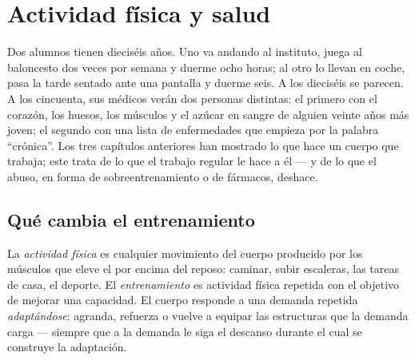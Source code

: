 \chapter{Actividad física y salud}\label{ch:g10:sport-and-health}

Dos alumnos tienen dieciséis años. Uno va andando al instituto, juega
al baloncesto dos veces por semana y duerme ocho horas; al otro lo
llevan en coche, pasa la tarde sentado ante una pantalla y duerme seis.
A los dieciséis se parecen. A los cincuenta, sus médicos verán dos
personas distintas: el primero con el corazón, los huesos, los músculos
y el azúcar en sangre de alguien veinte años más joven; el segundo con
una lista de enfermedades que empieza por la palabra ``crónica''. Los
tres capítulos anteriores han mostrado lo que hace un cuerpo que
trabaja; este trata de lo que el trabajo regular le hace a él --- y de
lo que el abuso, en forma de sobreentrenamiento o de fármacos,
deshace.

\section{Qué cambia el entrenamiento}

\begin{definition}\label{def:g10:sport-and-health:training}
La \emph{actividad física} es cualquier
movimiento del cuerpo producido por los músculos que eleve el  por encima del reposo: caminar, subir escaleras, las tareas
de casa, el deporte. El \emph{entrenamiento} es actividad física
repetida con el objetivo de mejorar una capacidad. El cuerpo responde a
una demanda repetida \emph{adaptándose}: agranda, refuerza o vuelve a
equipar las estructuras que la demanda carga --- siempre que a la
demanda le siga el descanso durante el cual se construye la adaptación.
\end{definition}

